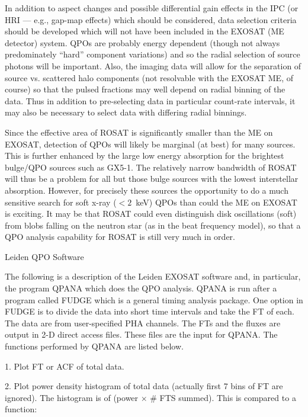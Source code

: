 {\list

In addition to aspect changes and possible differential gain effects
in the IPC (or HRI --- e.g., gap-map effects) which should be
considered, data selection criteria should be developed which will not
have been included in the EXOSAT (ME detector) system.  QPOs are
probably energy dependent (though not always predominately ``hard''
component variations) and so the radial selection of source photons
will be important.  Also, the imaging data will allow for the
separation of source vs. scattered halo components (not resolvable
with the EXOSAT ME, of course) so that the pulsed fractions may well
depend on radial binning of the data.  Thus in addition to
pre-selecting data in particular count-rate intervals, it may also be
necessary to select data with differing radial binnings.

Since the effective area of ROSAT is significantly smaller than the ME
on EXOSAT, detection of QPOs will likely be marginal (at best) for
many sources.  This is further enhanced by the large low energy
absorption for the brightest bulge/QPO sources such as GX5-1.  The
relatively narrow bandwidth of ROSAT will thus be a problem for all
but those bulge sources with the lowest interstellar absorption.
However, for precisely these sources the opportunity to do a much
 sensitive search for soft x-ray ($<2$~keV) QPOs than
could the ME on EXOSAT is exciting.  It may be that ROSAT could even
distinguish disk oscillations (soft) from blobs falling on the neutron
star (as in the beat frequency model), so that a QPO analysis
capability for ROSAT is still very much in order.

}

\@{Leiden QPO Software}

The following is a description of the Leiden EXOSAT software and, in particular, the
program QPANA which does the QPO analysis.  QPANA is run after a
program called FUDGE which is a general timing analysis package.  One
option in FUDGE is to divide the data into short time intervals and
take the FT of each.  The data are from user-specified PHA channels.
The FTs and the fluxes are output in 2-D direct access files.  These
files are the input for QPANA.  The functions performed by QPANA are
listed below.

\item{1.} Plot FT or ACF of total data.
\item{2.} Plot power density histogram of total data (actually first 7
bins of FT are ignored).  The histogram is of (power $\times$ \# FTS
summed).  This is compared to a function:

